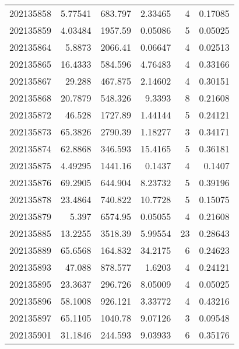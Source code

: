 \begin{tabular}{rrrrrr}
 202135858 &          5.77541 &      683.797  &            2.33465 &           4 & 0.17085 \\
 202135859 &          4.03484 &     1957.59   &            0.05086 &           5 & 0.05025 \\
 202135864 &          5.8873  &     2066.41   &            0.06647 &           4 & 0.02513 \\
 202135865 &         16.4333  &      584.596  &            4.76483 &           4 & 0.33166 \\
 202135867 &         29.288   &      467.875  &            2.14602 &           4 & 0.30151 \\
 202135868 &         20.7879  &      548.326  &            9.3393  &           8 & 0.21608 \\
 202135872 &         46.528   &     1727.89   &            1.44144 &           5 & 0.24121 \\
 202135873 &         65.3826  &     2790.39   &            1.18277 &           3 & 0.34171 \\
 202135874 &         62.8868  &      346.593  &           15.4165  &           5 & 0.36181 \\
 202135875 &          4.49295 &     1441.16   &            0.1437  &           4 & 0.1407  \\
 202135876 &         69.2905  &      644.904  &            8.23732 &           5 & 0.39196 \\
 202135878 &         23.4864  &      740.822  &           10.7728  &           5 & 0.15075 \\
 202135879 &          5.397   &     6574.95   &            0.05055 &           4 & 0.21608 \\
 202135885 &         13.2255  &     3518.39   &            5.99554 &          23 & 0.28643 \\
 202135889 &         65.6568  &      164.832  &           34.2175  &           6 & 0.24623 \\
 202135893 &         47.088   &      878.577  &            1.6203  &           4 & 0.24121 \\
 202135895 &         23.3637  &      296.726  &            8.05009 &           4 & 0.05025 \\
 202135896 &         58.1008  &      926.121  &            3.33772 &           4 & 0.43216 \\
 202135897 &         65.1105  &     1040.78   &            9.07126 &           3 & 0.09548 \\
 202135901 &         31.1846  &      244.593  &            9.03933 &           6 & 0.35176 \\

\end{tabular}
